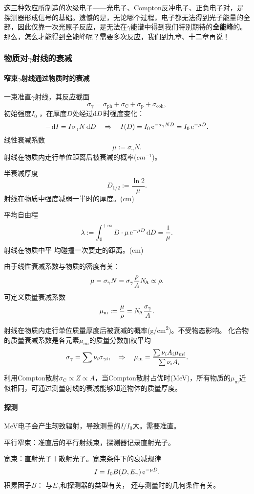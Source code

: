 这三种效应所制造的次级电子——光电子、Compton反冲电子、正负电子对，是探测器形成信号的基础。遗憾的是，无论哪个过程，电子都无法得到光子能量的全部，因此仅靠一次光原子反应，是无法在$\gamma$能谱中得到我们特别期待的\textbf{全能峰}的。
那么，怎么才能得到全能峰呢？需要多次反应，我们到九章、十二章再说！
\subsubsection[物质对\textit{\textgamma}射线的衰减]{物质对$\gamma$射线的衰减}
\paragraph{窄束$\gamma$射线通过物质时的衰减}
一束准直$\gamma$射线，其反应截面
\[
	\sigma_\gamma=\sigma_{\mathrm{ph}}+\sigma_{\mathrm C}+\sigma_{\mathrm p}+\sigma_{\mathrm{coh}},
\]
初始强度$I_0$ ，在厚度$D$处经过$\mathop{}\!\mathrm{d} D$时强度变化：
\[
	-\mathop{}\!\mathrm{d} I=I\sigma_\gamma N\mathop{}\!\mathrm{d} D\quad\Rightarrow\quad I(D)=I_0\mathop{}\!\mathrm{e}^{-\sigma_\gamma ND}=I_0\mathop{}\!\mathrm{e}^{-\mu D}.
\]
线性衰减系数
\[
	\mu:=\sigma_\gamma N.
\]
射线在物质内走行单位距离后被衰减的概率($\si{cm^{-1}}$)。

半衰减厚度
\[
	D_{1/2}:=\frac{\ln 2}\mu.
\]
射线在物质中强度减弱一半时的厚度。(cm)


平均自由程
\[
	\lambda:=\int_0^{+\infty} D\cdot\mu \mathop{}\!\mathrm{e}^{-\mu D}\mathop{}\!\mathrm{d} D=\frac1\mu.
\]
射线在物质中平
均碰撞一次要走的距离。(cm)

由于线性衰减系数与物质的密度有关：
\[
	\mu=\sigma_\gamma N=\sigma_\gamma\frac\rho{A}N_{\hspace{-1 pt}\mathrm A}\propto\rho.
\]
可定义质量衰减系数
\begin{align}
	\mu_\mathrm m:=\frac\mu\rho=N_{\hspace{-1 pt}\mathrm A}\frac{\sigma_\gamma}A.
\end{align}
射线在物质内走行单位质量厚度后被衰减的概率(\si{g/cm^2})。不受物态影响。
化合物的质量衰减系数是各元素$\mu_{\mathrm mi}$的质量分数加权平均
\[
	\sigma_\gamma=\sum\nu_i\sigma_{\gamma i},\quad\Rightarrow\quad\mu_\mathrm m=\frac{\sum\nu_iA_i\mu_{\mathrm mi}}{\sum\nu_iA_i}.
\]

利用Compton散射$\sigma_\mathrm C\propto Z\propto A$，当Compton散射占优时(MeV)，所有物质的$\mu_\mathrm m$近似相同，可通过测量射线的衰减能够知道物体的质量厚度。

\paragraph{探测}
MeV电子会产生轫致辐射，导致测量的$I/I_0$大。需要准直。

平行窄束：准直后的平行射线束，探测器记录直射光子。

宽束：直射光子＋散射光子。宽束条件下的衰减规律
\[
	I=I_0B(D,E_\gamma)\mathop{}\!\mathrm{e}^{-\mu D}.
\]
积累因子$B$：
与$E_\gamma$和探测器的类型有关，
还与测量时的几何条件有关。

